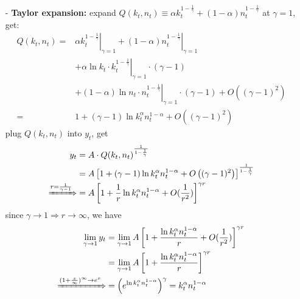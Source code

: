 \documentclass[10pt,landscape,a4paper]{article}
\begin{document}
\begin{multicols*}{4}
\begin{itemize}
\begin{itemize}
        \item[-] \textbf{Taylor expansion:} expand $Q(k_t,n_t)\equiv\alpha k_t^{1-\frac{1}{\gamma}}+(1-\alpha)n_t^{1-\frac{1}{\gamma}}$ at $\gamma=1$, get:
        \begin{align*}
            Q(k_t,n_t)= & \left.\alpha k_t^{1-\frac{1}{\gamma}}\right\vert_{\gamma=1}+\left.(1-\alpha)n_t^{1-\frac{1}{\gamma}}\right\vert_{\gamma=1}\\
            &+ \left.\alpha\ln k_t\cdot k_t^{1-\frac{1}{\gamma}}\right\vert_{\gamma=1}\cdot(\gamma-1)\\
            &+ \left. (1-\alpha)\ln n_t\cdot n_t^{1-\frac{1}{\gamma}} \right\vert_{\gamma=1}\cdot (\gamma-1) + O\left((\gamma-1)^2\right)\\
            = & 1+(\gamma-1)\ln k_t^{\alpha}n_t^{1-\alpha} +O\left((\gamma-1)^2\right)
        \end{align*}
        plug $Q(k_t,n_t)$ into $y_t$, get
        \begin{align*}
            y_t &= A\cdot Q(k_t,n_t)^{\frac{1}{1-\frac{1}{\gamma}}}\\
             &= A \left[1+(\gamma-1)\ln k_t^{\alpha}n_t^{1-\alpha} +O\left((\gamma-1)^2\right)\right]^{\frac{1}{1-\frac{1}{\gamma}}}\\
            \xRightarrow{r=\frac{1}{\gamma-1}} &= A\left[ 1+\frac{1}{r}\ln k_t^{\alpha}n_t^{1-\alpha} +O(\frac{1}{r^2}) \right]^{\gamma r}
        \end{align*}
        since $\gamma\rightarrow 1\Rightarrow r\rightarrow \infty$, we have 
        \begin{align*}
            \lim_{\gamma\rightarrow 1} y_t &= \lim_{\gamma\rightarrow 1} A\left[ 1+\frac{\ln k_t^{\alpha}n_t^{1-\alpha}}{r}+O(\frac{1}{r^2}) \right]^{\gamma r}\\
            &=\lim_{\gamma\rightarrow 1} A\left[ 1+\frac{\ln k_t^{\alpha}n_t^{1-\alpha}}{r} \right]^{\gamma r}\\
            \xRightarrow{(1+\frac{x}{\infty})^{\infty}\rightarrow e^x} & = \left(e^{\ln k_t^{\alpha}n_t^{1-\alpha}}\right)^{\gamma} = k_t^{\alpha}n_t^{1-\alpha}
        \end{align*}
    \end{itemize}
    

\end{itemize}
\end{multicols*}
\end{document}
